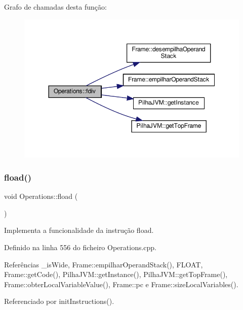 Grafo de chamadas desta função\+:
\nopagebreak
\begin{figure}[H]
\begin{center}
\leavevmode
\includegraphics[width=350pt]{classOperations_a85d79532189d640a6d02c99f204d2229_cgraph}
\end{center}
\end{figure}
\mbox{\label{classOperations_af6204248b38b7e6af3a4a6d0f805d79f}} 
\subsubsection{\texorpdfstring{fload()}{fload()}}
{\footnotesize\ttfamily void Operations\+::fload (\begin{DoxyParamCaption}{ }\end{DoxyParamCaption})\hspace{0.3cm}{\ttfamily [private]}}



Implementa a funcionalidade da instrução fload. 



Definido na linha 556 do ficheiro Operations.\+cpp.



Referências \+\_\+is\+Wide, Frame\+::empilhar\+Operand\+Stack(), F\+L\+O\+AT, Frame\+::get\+Code(), Pilha\+J\+V\+M\+::get\+Instance(), Pilha\+J\+V\+M\+::get\+Top\+Frame(), Frame\+::obter\+Local\+Variable\+Value(), Frame\+::pc e Frame\+::size\+Local\+Variables().



Referenciado por init\+Instructions().

